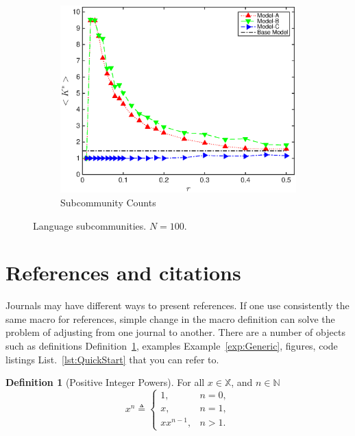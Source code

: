 \documentclass[pre,twocolumn,showkeys,longbibliography]{revtex4-1}
\newcommand{\reflst}[1]{List.~\ref{#1}}  %
\newcommand{\refdef}[1]{Definition~\ref{#1}}
\newcommand{\refexmp}[1]{Example~\ref{#1}}
\theoremstyle{plain}%
\theoremstyle{definition}
\newtheorem{defn}{Definition}[section]
\theoremstyle{remark}
\newcommand{\hSoX}{\mathbb{X}} %
\newcommand{\hSoN}{\mathbb{N}} %
\begin{document}
\begin{figure}[!tbp]
\begin{subfigure}{\columnwidth}
		\includegraphics[width=\columnwidth]
			{Fig-KStar100.eps}
		\caption{Subcommunity Counts} 
		\label{fig:FigKStar100}
	\end{subfigure}
	\caption{
		Language subcommunities.
		$N = 100$.
	} %
	\label{fig:N100}
\end{figure}






\section{References and citations}
\label{sec:ReferencesAndCitations}

Journals may have different ways to present references. 
If one use consistently the same macro for references,
simple change in the macro definition can solve 
the problem of adjusting from one journal to another.
There are a number of objects such as 
definitions \refdef{def:PositiveIntegerPowers}, 
examples \refexmp{exp:Generic},
figures, 
code listings \reflst{lst:QuickStart}
 that you can refer to.

\begin{defn}[Positive Integer Powers]
	For all $x \in \hSoX$, and $n \in \hSoN$
	\[
		x^{n} \triangleq
		\begin{cases}
			1, 
			 &n = 0, \\
			x, 
			 &n = 1, \\
			x x^{n-1},
			 &n > 1.
		\end{cases}
	\]
	\label{def:PositiveIntegerPowers}
\end{defn}
\end{document}
